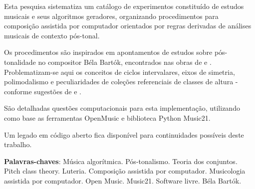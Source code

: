 \documentclass[
	12pt,				%
	openright,			%
	twoside,			%
	a4paper,			%
	english,			%
	french,				%
	spanish,			%
	brazil				%
	]{abntex2}
\begin{document}







\setlength{\absparsep}{18pt} %



\begin{resumo}


Esta pesquisa sistematiza um catálogo de experimentos constituído de estudos musicais e seus algoritmos geradores, organizando procedimentos para composição assistida por computador orientados por regras derivadas de análises musicais de contexto pós-tonal.


Os procedimentos são inspirados em apontamentos de estudos sobre pós-tonalidade no compositor Béla Bartók, encontrados nas obras de  e  . Problematizam-se aqui os conceitos de ciclos intervalares, eixos de simetria, polimodalismo e peculiaridades de coleções referenciais de classes de altura - conforme sugestões de 
 e .

São detalhadas questões computacionais para esta implementação, utilizando como base as ferramentas OpenMusic e biblioteca Python Music21. 

Um legado em código aberto fica disponível para continuidades possíveis deste trabalho.


 \textbf{Palavras-chaves}: Música algorítmica. Pós-tonalismo. Teoria dos conjuntos. Pitch class theory. Luteria. Composição assistida por computador. Musicologia assistida por computador. Open Music. Music21. Software livre. Béla Bartók.
\end{resumo}
\end{document}
